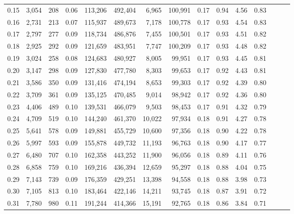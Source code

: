 \begin{tabular}{rrrrrrrrrrrrrrr}
0.15 &   3,054 &    208 &  0.06 &  113,206 &  492,404 &    6,965 &  100,991 &  0.17 &  0.94 &  4.56 &      0.83 \\
0.16 &   2,731 &    213 &  0.07 &  115,937 &  489,673 &    7,178 &  100,778 &  0.17 &  0.93 &  4.54 &      0.83 \\
0.17 &   2,797 &    277 &  0.09 &  118,734 &  486,876 &    7,455 &  100,501 &  0.17 &  0.93 &  4.51 &      0.82 \\
0.18 &   2,925 &    292 &  0.09 &  121,659 &  483,951 &    7,747 &  100,209 &  0.17 &  0.93 &  4.48 &      0.82 \\
0.19 &   3,024 &    258 &  0.08 &  124,683 &  480,927 &    8,005 &   99,951 &  0.17 &  0.93 &  4.45 &      0.81 \\
0.20 &   3,147 &    298 &  0.09 &  127,830 &  477,780 &    8,303 &   99,653 &  0.17 &  0.92 &  4.43 &      0.81 \\
0.21 &   3,586 &    350 &  0.09 &  131,416 &  474,194 &    8,653 &   99,303 &  0.17 &  0.92 &  4.39 &      0.80 \\
0.22 &   3,709 &    361 &  0.09 &  135,125 &  470,485 &    9,014 &   98,942 &  0.17 &  0.92 &  4.36 &      0.80 \\
0.23 &   4,406 &    489 &  0.10 &  139,531 &  466,079 &    9,503 &   98,453 &  0.17 &  0.91 &  4.32 &      0.79 \\
0.24 &   4,709 &    519 &  0.10 &  144,240 &  461,370 &   10,022 &   97,934 &  0.18 &  0.91 &  4.27 &      0.78 \\
0.25 &   5,641 &    578 &  0.09 &  149,881 &  455,729 &   10,600 &   97,356 &  0.18 &  0.90 &  4.22 &      0.78 \\
0.26 &   5,997 &    593 &  0.09 &  155,878 &  449,732 &   11,193 &   96,763 &  0.18 &  0.90 &  4.17 &      0.77 \\
0.27 &   6,480 &    707 &  0.10 &  162,358 &  443,252 &   11,900 &   96,056 &  0.18 &  0.89 &  4.11 &      0.76 \\
0.28 &   6,858 &    759 &  0.10 &  169,216 &  436,394 &   12,659 &   95,297 &  0.18 &  0.88 &  4.04 &      0.75 \\
0.29 &   7,143 &    739 &  0.09 &  176,359 &  429,251 &   13,398 &   94,558 &  0.18 &  0.88 &  3.98 &      0.73 \\
0.30 &   7,105 &    813 &  0.10 &  183,464 &  422,146 &   14,211 &   93,745 &  0.18 &  0.87 &  3.91 &      0.72 \\
0.31 &   7,780 &    980 &  0.11 &  191,244 &  414,366 &   15,191 &   92,765 &  0.18 &  0.86 &  3.84 &      0.71 \\

\end{tabular}
